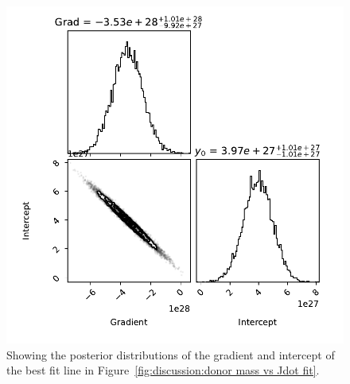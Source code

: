 \begin{figure}
    \centering
    \includegraphics[width=\textwidth]{figures/results/Mdot/Mr_Jdot_ex_corner.pdf}
    \caption{Showing the posterior distributions of the gradient and intercept of the best fit line in Figure~\ref{fig:discussion:donor mass vs Jdot fit}.}
    \label{fig:discussion:donor mass vs Jdot corner}
\end{figure}

